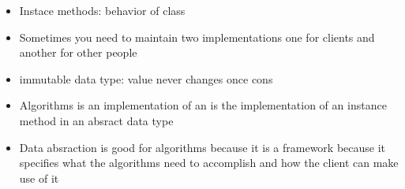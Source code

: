 \documentclass[11pt]{report}
\begin{document}
\begin{itemize}
\item Instace methods: behavior of class

\item Sometimes you need to maintain two implementations
one for clients and another for other people

\item immutable data type: value never changes once cons

\item Algorithms is an implementation of an is the implementation of an
instance method in an absract data type

\item Data absraction is good for algorithms because it is a framework
because it specifies what the algorithms need to accomplish and how the client
can make use of it
\end{itemize}
\end{document}
